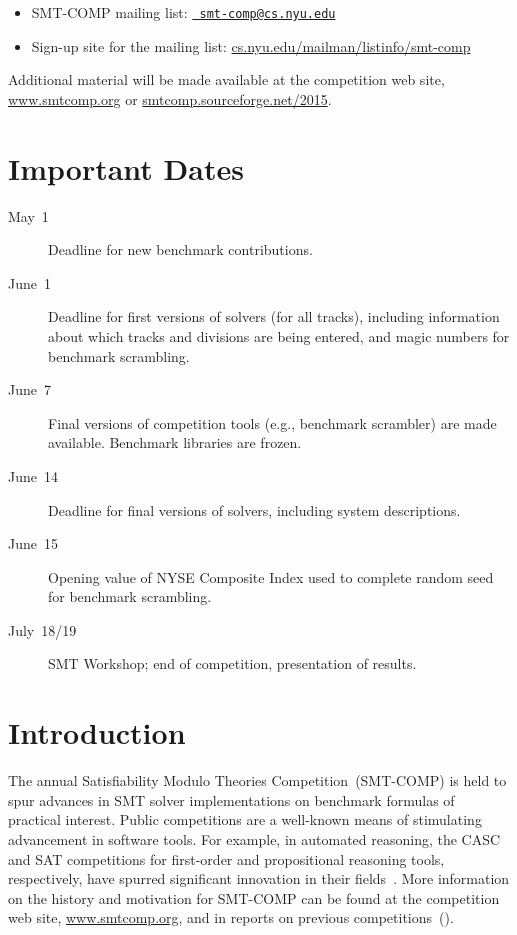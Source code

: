 \documentclass[12pt]{article}
\begin{document}
\begin{itemize}
\item SMT-COMP mailing list: \href{mailto:smt-comp@cs.nyu.edu}{\tt
  smt-comp@cs.nyu.edu}
\item Sign-up site for the mailing list:
  \url{cs.nyu.edu/mailman/listinfo/smt-comp}
\end{itemize}

\noindent Additional material will be made available at the
competition web site, \url{www.smtcomp.org} or
\url{smtcomp.sourceforge.net/2015}.


\newpage

\section{Important Dates}
\label{sec:important}

\begin{description}
\item[May~1] Deadline for new benchmark contributions.
\item[June~1] Deadline for first versions of solvers (for all tracks),
  including information about which tracks and divisions are being
  entered, and magic numbers for benchmark scrambling.
\item[June~7] Final versions of competition tools (e.g., benchmark
  scrambler) are made available.  Benchmark libraries are frozen.
\item[June~14] Deadline for final versions of solvers, including
  system descriptions.
\item[June~15] Opening value of NYSE Composite Index used to complete
  random seed for benchmark scrambling.
\item[July~18/19] SMT Workshop; end of competition, presentation of
  results.
\end{description}


\section{Introduction}
\label{sec:intro}

The annual Satisfiability Modulo Theories Competition~(SMT-COMP) is
held to spur advances in SMT solver implementations on benchmark
formulas of practical interest.  Public competitions are a well-known
means of stimulating advancement in software tools.  For example, in
automated reasoning, the CASC and SAT competitions for first-order and
propositional reasoning tools, respectively, have spurred significant
innovation in their fields~\cite{leberre+03,PSS02}.  More information
on the history and motivation for SMT-COMP can be found at the
competition web site, \url{www.smtcomp.org}, and in reports on
previous
competitions~(\cite{SMTCOMP2012,SMTEVAL2013,SMTCOMP-JAR,SMTCOMP-FMSD,SMTCOMP-2008,BDOS08}).
\end{document}
